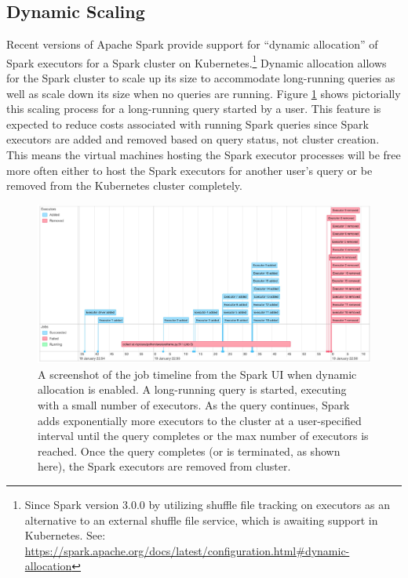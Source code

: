 \documentclass[twocolumn, linenumbers]{aastex631}
\begin{document}
\subsection{Dynamic Scaling}

Recent versions of Apache Spark provide support for ``dynamic allocation'' of Spark executors for a Spark cluster on Kubernetes.\footnote{Since Spark version 3.0.0 by utilizing shuffle file tracking on executors as an alternative to an external shuffle file service, which is awaiting support in Kubernetes. See: \url{https://spark.apache.org/docs/latest/configuration.html\#dynamic-allocation}} Dynamic allocation allows for the Spark cluster to scale up its size to accommodate long-running queries as well as scale down its size when no queries are running. Figure \ref{fig:dynamic_allocation} shows pictorially this scaling process for a long-running query started by a user. This feature is expected to reduce costs associated with running Spark queries since Spark executors are added and removed based on query status, not cluster creation. This means the virtual machines hosting the Spark executor processes will be free more often either to host the Spark executors for another user's query or be removed from the Kubernetes cluster completely.

\begin{figure}
    \centering
    \includegraphics[width=\linewidth]{dynamic_allocation.pdf}
    \caption{A screenshot of the job timeline from the Spark UI when dynamic allocation is enabled. A long-running query is started, executing with a small number of executors. As the query continues, Spark adds exponentially more executors to the cluster at a user-specified interval until the query completes or  the max number of executors is reached. Once the query completes (or is terminated, as shown here), the Spark executors are removed from cluster.}
    \label{fig:dynamic_allocation}
\end{figure}
\end{document}
